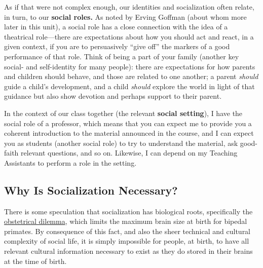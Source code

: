 \documentclass[
  letterpaper,
  DIV=11,
  numbers=noendperiod,
  oneside]{scrartcl}
\begin{document}
As if that were not complex enough, our identities and socialization
often relate, in turn, to our \textbf{social roles.} As noted by Erving
Goffman (about whom more later in this unit), a social role has a close
connection with the idea of a theatrical role---there are expectations
about how you should act and react, in a given context, if you are to
persuasively ``give off'' the markers of a good performance of that
role. Think of being a part of your family (another key social- and
self-identity for many people): there are expectations for how parents
and children should behave, and those are related to one another; a
parent \emph{should} guide a child's development, and a child
\emph{should} explore the world in light of that guidance but also show
devotion and perhaps support to their parent.


In the context of our class together (the relevant \textbf{social
setting}), I have the social role of a professor, which means that you
can expect me to provide you a coherent introduction to the material
announced in the course, and I can expect you as students (another
social role) to try to understand the material, ask good-faith relevant
questions, and so on. Likewise, I can depend on my Teaching Assistants
to perform a role in the setting.


\subsection{Why Is Socialization
Necessary?}\label{why-is-socialization-necessary}

There is some speculation that socialization has biological roots,
specifically the
\href{https://en.wikipedia.org/wiki/Obstetrical_dilemma}{obstetrical
dilemma}, which limits the maximum brain size at birth for bipedal
primates. By consequence of this fact, and also the sheer
technical and cultural complexity of social life, it is simply
impossible for people, at birth, to have all relevant cultural
information necessary to exist as they do stored in their brains at the
time of birth.
\end{document}
